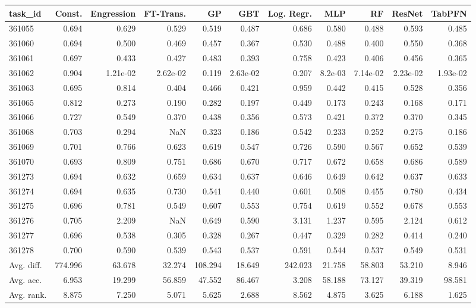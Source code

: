\begin{tabular}{lrrrrrrrrrr}
\toprule
task\_id & Const. & Engression & FT-Trans. & GP & GBT & Log. Regr. & MLP & RF & ResNet & TabPFN \\
\midrule
361055 & 0.694 & 0.629 & 0.529 & 0.519 & 0.487 & 0.686 & 0.580 & 0.488 & 0.593 & 0.485 \\
361060 & 0.694 & 0.500 & 0.469 & 0.457 & 0.367 & 0.530 & 0.488 & 0.400 & 0.550 & 0.368 \\
361061 & 0.697 & 0.433 & 0.427 & 0.483 & 0.393 & 0.758 & 0.423 & 0.406 & 0.456 & 0.365 \\
361062 & 0.904 & 1.21e-02 & 2.62e-02 & 0.119 & 2.63e-02 & 0.207 & 8.2e-03 & 7.14e-02 & 2.23e-02 & 1.93e-02 \\
361063 & 0.695 & 0.814 & 0.404 & 0.466 & 0.421 & 0.959 & 0.442 & 0.415 & 0.528 & 0.356 \\
361065 & 0.812 & 0.273 & 0.190 & 0.282 & 0.197 & 0.449 & 0.173 & 0.243 & 0.168 & 0.171 \\
361066 & 0.727 & 0.549 & 0.370 & 0.438 & 0.356 & 0.573 & 0.421 & 0.372 & 0.370 & 0.345 \\
361068 & 0.703 & 0.294 & NaN & 0.323 & 0.186 & 0.542 & 0.233 & 0.252 & 0.275 & 0.186 \\
361069 & 0.701 & 0.766 & 0.623 & 0.619 & 0.547 & 0.726 & 0.590 & 0.567 & 0.652 & 0.539 \\
361070 & 0.693 & 0.809 & 0.751 & 0.686 & 0.670 & 0.717 & 0.672 & 0.658 & 0.686 & 0.589 \\
361273 & 0.694 & 0.632 & 0.659 & 0.634 & 0.637 & 0.646 & 0.649 & 0.642 & 0.637 & 0.633 \\
361274 & 0.694 & 0.635 & 0.730 & 0.541 & 0.440 & 0.601 & 0.508 & 0.455 & 0.780 & 0.434 \\
361275 & 0.696 & 0.781 & 0.549 & 0.607 & 0.553 & 0.754 & 0.619 & 0.552 & 0.678 & 0.553 \\
361276 & 0.705 & 2.209 & NaN & 0.649 & 0.590 & 3.131 & 1.237 & 0.595 & 2.124 & 0.612 \\
361277 & 0.696 & 0.538 & 0.305 & 0.328 & 0.267 & 0.447 & 0.329 & 0.282 & 0.414 & 0.240 \\
361278 & 0.700 & 0.590 & 0.539 & 0.543 & 0.537 & 0.591 & 0.544 & 0.537 & 0.549 & 0.531 \\
Avg. diff. & 774.996 & 63.678 & 32.274 & 108.294 & 18.649 & 242.023 & 21.758 & 58.803 & 53.210 & 8.946 \\
Avg. acc. & 6.953 & 19.299 & 56.859 & 47.552 & 86.467 & 3.208 & 58.188 & 73.127 & 39.319 & 98.581 \\
Avg. rank. & 8.875 & 7.250 & 5.071 & 5.625 & 2.688 & 8.562 & 4.875 & 3.625 & 6.188 & 1.625 \\
\bottomrule
\end{tabular}

